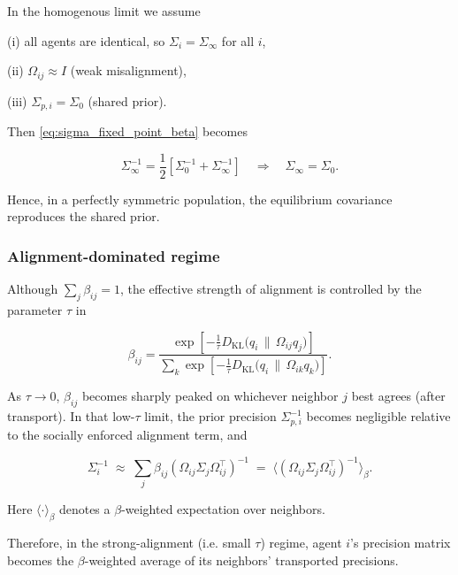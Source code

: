 \documentclass[11pt]{article}
\begin{document}
In the homogenous limit we assume 

(i) all agents are identical, so $\Sigma_i = \Sigma_\infty$ for all $i$,

(ii) $\Omega_{ij} \approx I$ (weak misalignment),

(iii) $\Sigma_{p,i} = \Sigma_0$ (shared prior).

Then \eqref{eq:sigma_fixed_point_beta} becomes

\begin{equation}
\Sigma_\infty^{-1}
=\frac{1}{2}
\left[
\Sigma_0^{-1}
+ \Sigma_\infty^{-1}
\right]
\quad\Longrightarrow\quad
\Sigma_\infty = \Sigma_0.
\end{equation}

Hence, in a perfectly symmetric population, the equilibrium covariance reproduces the shared prior.

\subsubsection{Alignment-dominated regime}

Although $\sum_j \beta_{ij} = 1$, the effective strength of alignment is controlled by the parameter $\tau$ in

\begin{equation}
\beta_{ij}
=\frac{
\exp\!\left[
-\frac{1}{\tau}
D_{\mathrm{KL}}\!\big(q_i \,\|\, \Omega_{ij} q_j\big)
\right]
}{\sum_k
\exp\!\left[
-\frac{1}{\tau}
D_{\mathrm{KL}}\!\big(q_i \,\|\, \Omega_{ik} q_k\big)
\right]}.
\end{equation}

As $\tau \to 0$, $\beta_{ij}$ becomes sharply peaked on whichever neighbor $j$ best agrees (after transport). In that low-$\tau$ limit, the prior precision $\Sigma_{p,i}^{-1}$ becomes negligible relative to the socially enforced alignment term, and

\begin{equation}
\boxed{
\Sigma_i^{-1}
\;\approx\;
\sum_j \beta_{ij}
(\Omega_{ij}\Sigma_j\Omega_{ij}^\top)^{-1}
\;=\;\big\langle(\Omega_{ij}\Sigma_j\Omega_{ij}^\top)^{-1}
\big\rangle_{\beta}.}
\label{eq:beta_weighted_precision}
\end{equation}

Here $\langle \cdot \rangle_{\beta}$ denotes a $\beta$-weighted expectation over neighbors.  

Therefore, in the strong-alignment (i.e. small $\tau$) regime, agent $i$’s precision matrix becomes the $\beta$-weighted average of its neighbors' transported precisions.
\end{document}
